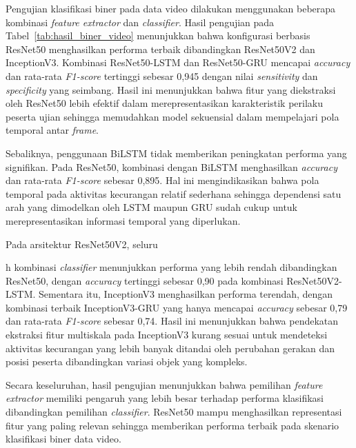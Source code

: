 \documentclass {rapidsart}
\theoremstyle{plain}
\theoremstyle{remark}
\theoremstyle{definition}
\begin{document}
Pengujian klasifikasi biner pada data video dilakukan menggunakan beberapa kombinasi \textit{feature extractor} dan \textit{classifier}. Hasil pengujian pada Tabel~\ref{tab:hasil_biner_video} menunjukkan bahwa konfigurasi berbasis ResNet50 menghasilkan performa terbaik dibandingkan ResNet50V2 dan InceptionV3. Kombinasi ResNet50-LSTM dan ResNet50-GRU mencapai \textit{accuracy} dan rata-rata \textit{F1-score} tertinggi sebesar 0,945 dengan nilai \textit{sensitivity} dan \textit{specificity} yang seimbang. Hasil ini menunjukkan bahwa fitur yang diekstraksi oleh ResNet50 lebih efektif dalam merepresentasikan karakteristik perilaku peserta ujian sehingga memudahkan model sekuensial dalam mempelajari pola temporal antar \textit{frame}.

Sebaliknya, penggunaan BiLSTM tidak memberikan peningkatan performa yang signifikan. Pada ResNet50, kombinasi dengan BiLSTM menghasilkan \textit{accuracy} dan rata-rata \textit{F1-score} sebesar 0,895. Hal ini mengindikasikan bahwa pola temporal pada aktivitas kecurangan relatif sederhana sehingga dependensi satu arah yang dimodelkan oleh LSTM maupun GRU sudah cukup untuk merepresentasikan informasi temporal yang diperlukan.

Pada arsitektur ResNet50V2, seluru

h kombinasi \textit{classifier} menunjukkan performa yang lebih rendah dibandingkan ResNet50, dengan \textit{accuracy} tertinggi sebesar 0,90 pada kombinasi ResNet50V2-LSTM. Sementara itu, InceptionV3 menghasilkan performa terendah, dengan kombinasi terbaik InceptionV3-GRU yang hanya mencapai \textit{accuracy} sebesar 0,79 dan rata-rata \textit{F1-score} sebesar 0,74. Hasil ini menunjukkan bahwa pendekatan ekstraksi fitur multiskala pada InceptionV3 kurang sesuai untuk mendeteksi aktivitas kecurangan yang lebih banyak ditandai oleh perubahan gerakan dan posisi peserta dibandingkan variasi objek yang kompleks.

Secara keseluruhan, hasil pengujian menunjukkan bahwa pemilihan \textit{feature extractor} memiliki pengaruh yang lebih besar terhadap performa klasifikasi dibandingkan pemilihan \textit{classifier}. ResNet50 mampu menghasilkan representasi fitur yang paling relevan sehingga memberikan performa terbaik pada skenario klasifikasi biner data video.
\end{document}
